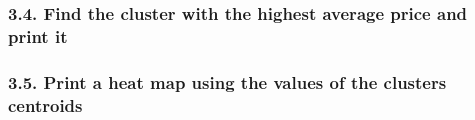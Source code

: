 \documentclass[
]{article}
\begin{document}
\hypertarget{find-the-cluster-with-the-highest-average-price-and-print-it-2}{%
\subsubsection{3.4. Find the cluster with the highest average price and
print
it}\label{find-the-cluster-with-the-highest-average-price-and-print-it-2}}

\hypertarget{print-a-heat-map-using-the-values-of-the-clusters-centroids-2}{%
\subsubsection{3.5. Print a heat map using the values of the clusters
centroids}\label{print-a-heat-map-using-the-values-of-the-clusters-centroids-2}}
\end{document}
